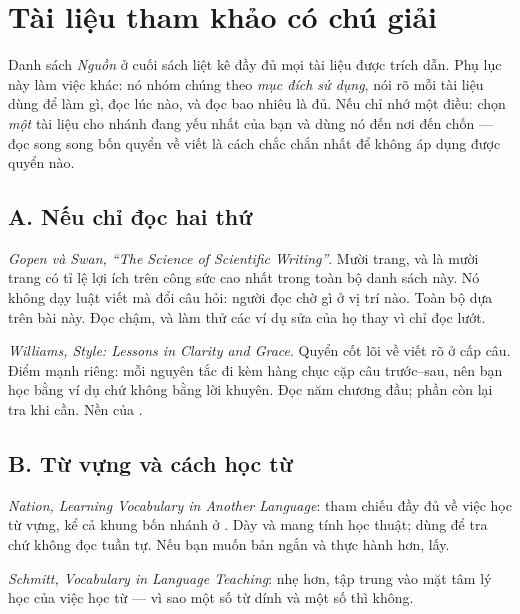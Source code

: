 \documentclass[english.tex]{subfiles}
\begin{document}
\chapter*{Tài liệu tham khảo có chú giải}

\begin{tomtat}
Danh sách \emph{Nguồn} ở cuối sách liệt kê đầy đủ mọi tài liệu được trích dẫn. Phụ lục này làm việc khác: nó nhóm chúng theo \emph{mục đích sử dụng}, nói rõ mỗi tài liệu dùng để làm gì, đọc lúc nào, và đọc bao nhiêu là đủ. Nếu chỉ nhớ một điều: chọn \emph{một} tài liệu cho nhánh đang yếu nhất của bạn và dùng nó đến nơi đến chốn --- đọc song song bốn quyển về viết là cách chắc chắn nhất để không áp dụng được quyển nào.
\end{tomtat}

\section*{A. Nếu chỉ đọc hai thứ}

\emph{Gopen và Swan, ``The Science of Scientific Writing''}\cite{gopenswan1990}. Mười trang, và là mười trang có tỉ lệ lợi ích trên công sức cao nhất trong toàn bộ danh sách này. Nó không dạy luật viết mà đổi câu hỏi: người đọc chờ gì ở vị trí nào. Toàn bộ  dựa trên bài này. Đọc chậm, và làm thử các ví dụ sửa của họ thay vì chỉ đọc lướt.

\emph{Williams, \emph{Style: Lessons in Clarity and Grace}}\cite{williams2016}. Quyển cốt lõi về viết rõ ở cấp câu. Điểm mạnh riêng: mỗi nguyên tắc đi kèm hàng chục cặp câu trước--sau, nên bạn học bằng ví dụ chứ không bằng lời khuyên. Đọc năm chương đầu; phần còn lại tra khi cần. Nền của .

\section*{B. Từ vựng và cách học từ}

\emph{Nation, \emph{Learning Vocabulary in Another Language}}\cite{nation2013}: tham chiếu đầy đủ về việc học từ vựng, kể cả khung bốn nhánh ở . Dày và mang tính học thuật; dùng để tra chứ không đọc tuần tự. Nếu bạn muốn bản ngắn và thực hành hơn, lấy\cite{webbnation2017}.

\emph{Schmitt, \emph{Vocabulary in Language Teaching}}\cite{schmitt2000}: nhẹ hơn, tập trung vào mặt tâm lý học của việc học từ --- vì sao một số từ dính và một số thì không.
\end{document}
